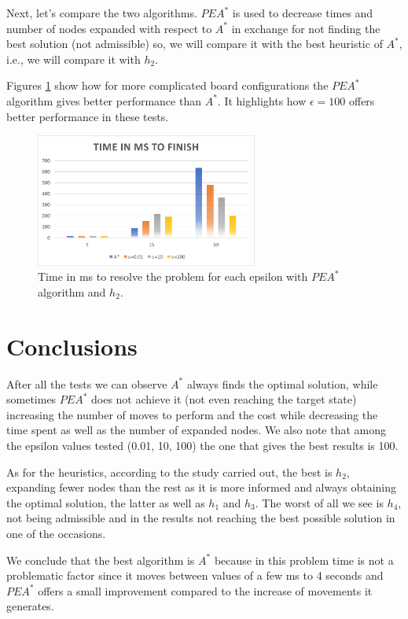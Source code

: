 \documentclass[runningheads]{llncs}
\begin{document}
Next, let's compare the two algorithms.
$PEA^*$ is used to decrease times and number of nodes expanded
with respect to $A^*$ in exchange for not finding the best solution (not admissible) so,
we will compare it with the best heuristic of $A^*$, i.e., we will compare it with $h_2$.

Figures \ref{fig4} show how for more complicated board configurations the $PEA^*$ algorithm gives
better performance than $A^*$.
It highlights how $\epsilon=100$ offers better performance in these tests.

\begin{figure}
    \centering
    \includegraphics[width=0.65\textwidth]{time_AvsPEA.png}
    \caption{Time in ms to resolve the problem for each epsilon with $PEA^*$ algorithm and $h_2$.} \label{fig4}
\end{figure}
\section{Conclusions}
After all the tests we can observe $A^*$ always finds the optimal solution, while sometimes 
$PEA^*$ does not achieve it (not even reaching the target state) increasing 
the number of moves to perform and the cost while decreasing the time spent 
as well as the number of expanded nodes. We also note that among the epsilon 
values tested (0.01, 10, 100) the one that gives the best results is 100.

As for the heuristics, according to the study carried out, the best is $h_2$, 
expanding fewer nodes than the rest as it is more informed and always obtaining 
the optimal solution, the latter as well as $h_1$ and $h_3$. The worst of all we 
see is $h_4$, not being admissible and in the results not reaching the best possible 
solution in one of the occasions.

We conclude that the best algorithm is $A^*$ because in this problem time is not
a problematic factor since it moves between values of a few ms to 4 seconds and
$PEA^*$ offers a small improvement compared to the increase of movements it generates.
\end{document}
